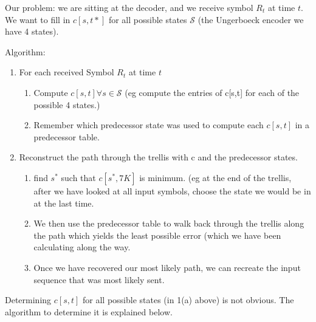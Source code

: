 \documentclass{article}
\begin{document}
Our problem: we are sitting at the decoder, and we receive symbol $R_t$ at time $t$. We want to fill in 
$c[s,t*]$ for all possible states $\mathcal{S}$ (the Ungerboeck encoder we have 4 states).

Algorithm:
\begin{enumerate}
\item For each received Symbol $R_t$ at time $t$
	\begin{enumerate}
	\item Compute $c[s,t] \forall s \in \mathcal{S}$ (eg compute the entries
 	       of c[s,t] for each of the possible 4 states.)
	\item Remember which predecessor state was used to compute each $c[s,t]$ in
	       a predecessor table.
	\end{enumerate}
\item Reconstruct the path through the trellis with c and the predecessor states.
	\begin{enumerate}
	\item find $s^*$ such that $c[s^*,7K]$ is minimum. (eg at the end of the trellis, 
	       after we have looked at all input symbols, choose the state we would 
	       be in at the last time. 
	\item We then use the predecessor table to walk back through the trellis
	       along the path which yields the least possible error (which we have 
	       been calculating along the way.
	\item Once we have recovered our most likely path, we can recreate the
	       input sequence that was most likely sent.
	\end{enumerate} 
\end{enumerate}

Determining $c[s,t]$ for all possible states (in 1(a) above) is not obvious.
The algorithm to determine it is explained below.  
\end{document}
